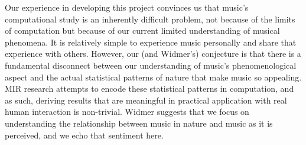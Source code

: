 Our experience in developing this project convinces us that music's computational study is an inherently difficult problem, not because of the limits of computation but because of our current limited understanding of musical phenomena. It is relatively simple to experience music personally and share that experience with others. However, our (and Widmer's) conjecture is that there is a fundamental disconnect between our understanding of music's phenomenological aspect and the actual statistical patterns of nature that make music so appealing. MIR research attempts to encode these statistical patterns in computation, and as such, deriving results that are meaningful in practical application with real human interaction is non-trivial. Widmer suggests that we focus on understanding the relationship between music in nature and music as it is perceived, and we echo that sentiment here. 

